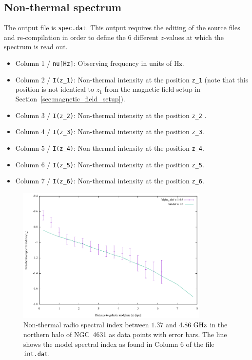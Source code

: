 \documentclass[11pt,twocolumn,a4paper]{article}
\begin{document}
\subsection{Non-thermal spectrum}
The output file is {\tt spec.dat}. This output requires the editing of the source files and re-compilation in order to define the 6 different $z$-values at which the spectrum is read out.
\begin{itemize}
\item Column 1 / {\tt nu[Hz]}: Observing frequency in units of Hz.
\item Column 2 / {\tt I(z\_1)}: Non-thermal intensity at the position {\tt z\_1}  (note that this position is not identical to $z_1$ from the magnetic field setup in Section~\ref{sec:magnetic_field_setup}).
\item Column 3 / {\tt I(z\_2)}: Non-thermal intensity at the position {\tt z\_2} .
\item Column 4 / {\tt I(z\_3)}: Non-thermal intensity at the position {\tt z\_3}.
\item Column 5 / {\tt I(z\_4)}: Non-thermal intensity at the position {\tt z\_4}.
\item Column 6 / {\tt I(z\_5)}: Non-thermal intensity at the position {\tt z\_5}.
\item Column 7 / {\tt I(z\_6)}: Non-thermal intensity at the position {\tt z\_6}.
\end{itemize}


\begin{figure}
  \centering
  \includegraphics[width=0.85\textwidth]{alpha_profile}
  \caption{Non-thermal radio spectral index between $1.37$ and $4.86~\rm GHz$ in the northern halo of NGC~4631 as data points with error bars. The line shows the model spectral index as found in Column 6 of the file {\tt int.dat}.}
\label{fig:alpha_profile}
\end{figure}
\end{document}
